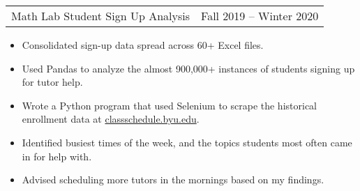 \documentclass{article}
\newenvironment{compactItemize}{
  \begin{itemize}[itemsep=0ex, parsep=0ex, partopsep=0ex, topsep= -7pt]
}{
  \end{itemize}
}
\newcommand{\project}[2]{
  \begingroup
  \setlength{\tabcolsep}{0ex}
  \begin{tabularx}{\linewidth}{X r}
    #1 & %
    #2\\ %
  \end{tabularx}%
  \endgroup%
}
\begin{document}
\project{Math Lab Student Sign Up Analysis}{Fall 2019 -- Winter 2020}
\begin{compactItemize}
  \item Consolidated sign-up data spread across 60+ Excel files.
  \item Used Pandas to analyze the almost 900,000+ instances of students signing up for tutor help.
  \item Wrote a Python program that used Selenium to scrape the historical enrollment data at \href{https://classschedule.byu.edu}{classschedule.byu.edu}.
  \item Identified busiest times of the week, and the topics students most often came in for help with.
  \item Advised scheduling more tutors in the mornings based on my findings.
\end{compactItemize}
\medskip
\begin{comment}
\project{HTTP Proxy}{Winter 2020}
\begin{compactItemize}
  \item C program that relayed user requests to end server, and relayed server responses to user.
  \item Used \texttt{regex.h} to verify that user requests met HTTP formatting requirements.
  \item Handled concurrent requests with a threadpool using \texttt{pthread.h} and \texttt{semaphore.h}.
\end{compactItemize}
\medskip

\project{DNS Stub Resolver}{Winter 2020}
\begin{compactItemize}
  \item Program interfaced with DNS servers to look up IP addresses associated with a web domain name.
        For example, it would figure out that the domain name www.example.com is associated with IP address 93.184.216.34.
  \item Formatted queries to DNS standards, sent the queries with UDP, and then decoded responses.
  \item Written C with \texttt{unistd.h}, \texttt{sys/socket.h}, \texttt{arpa/inet.h}, and \texttt{netinet/in.h}.
\end{compactItemize}
\medskip

\project{OpenMP with Mandelbrot Set}{Winter 2020}
\begin{compactItemize}
  \item Parallelized the \href{https://gist.github.com/andrejbauer/7919569}{Mandelbrot visualization code} posted on github by Andrej Bauer.
\end{compactItemize}
\medskip

\project{Tiny Shell}{Winter 2020}
\begin{compactItemize}
  \item Wrote a simple shell that could handle process creation, I/O redirection and pipelines, and process control.
  \item Used C with \texttt{unistd.h} and \texttt{signal.h}.
\end{compactItemize}
\medskip
\end{comment}
\end{document}
